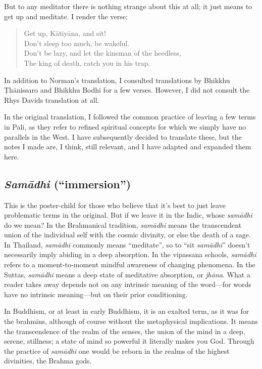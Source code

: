 \documentclass[12pt,openany]{book}%
\begin{document}
But to any meditator there is nothing strange about this at all; it just means to get up and meditate. I render the verse:

\begin{quotation}%
Get up, \textsanskrit{Kātiyāna}, and sit! \\
Don’t sleep too much, be wakeful. \\
Don’t be lazy, and let the kinsman of the heedless, \\
The king of death, catch you in his trap.

%
\end{quotation}

In addition to Norman’s translation, I consulted translations by Bhikkhu \textsanskrit{Ṭhānissaro} and Bhikkhu Bodhi for a few verses. However, I did not consult the Rhys Davids translation at all.

In the original translation, I followed the common practice of leaving a few terms in Pali, as they refer to refined spiritual concepts for which we simply have no parallels in the West. I have subsequently decided to translate these, but the notes I made are, I think, still relevant, and I have adapted and expanded them here.

\subsection*{\textit{\textsanskrit{Samādhi}} (“immersion”)}

This is the poster-child for those who believe that it’s best to just leave problematic terms in the original. But if we leave it in the Indic, whose \textit{\textsanskrit{samādhi}} do we mean? In the Brahmanical tradition, \textit{\textsanskrit{samādhi}} means the transcendent union of the individual self with the cosmic divinity, or else the death of a sage. In Thailand, \textit{\textsanskrit{samādhi}} commonly means “meditate”, so to “sit \textit{\textsanskrit{samādhi}}” doesn’t necessarily imply abiding in a deep absorption. In the vipassana schools, \textit{\textsanskrit{samādhi}} refers to a moment-to-moment mindful awareness of changing phenomena. In the Suttas, \textit{\textsanskrit{samādhi}} means a deep state of meditative absorption, or \textit{\textsanskrit{jhāna}}. What a reader takes away depends not on any intrinsic meaning of the word—for words have no intrinsic meaning—but on their prior conditioning.

In Buddhism, or at least in early Buddhism, it is an exalted term, as it was for the brahmins, although of course without the metaphysical implications. It means the transcendence of the realm of the senses, the union of the mind in a deep, serene, stillness; a state of mind so powerful it literally makes you God. Through the practice of \textit{\textsanskrit{samādhi}} one would be reborn in the realms of the highest divinities, the Brahma gods.
\end{document}
